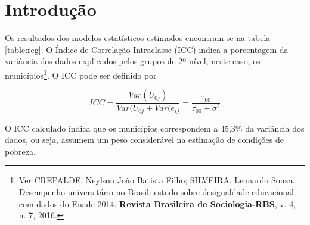 \documentclass[a4paper, 12pt, openright, oneside, english, brazil, article]{abntex2}
\begin{document}
	\pretextual
	\maketitle
	
	\textual
	

	\section{Introdução}	
		Os resultados dos modelos estatísticos estimados encontram-se na tabela \ref{table:reg}. O Índice de Correlação Intraclasse (ICC) indica a porcentagem da variância dos dados explicados pelos grupos de 2º nível, neste caso, os municípios\footnote{Ver CREPALDE, Neylson João Batista Filho; SILVEIRA, Leonardo Souza. Desempenho universitário no Brasil: estudo sobre desigualdade educacional com dados do Enade 2014. \textbf{Revista Brasileira de Sociologia-RBS}, v. 4, n. 7, 2016.}. O ICC pode ser definido por
		
		$$ICC = \frac{Var(U_{0j})}{Var(U_{0j} + Var(e_{ij}} = \frac{\tau_{00}}{\tau_{00} + \sigma^2} $$
		
		O ICC calculado indica que os municípios correspondem a 45,3\% da variância dos dados, ou seja, assumem um peso considerável na estimação de condições de pobreza.
		
\end{document}
